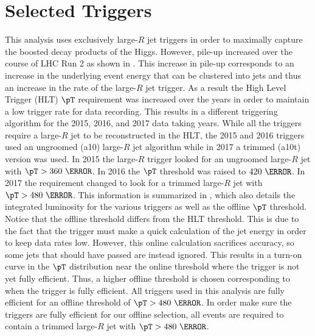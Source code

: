 \section{Selected Triggers} \label{sec:selection:triggers}

This analysis uses exclusively large-$R$ jet triggers in order to maximally
capture the boosted decay products of the Higgs. However, pile-up increased
over the course of LHC Run 2 as shown in . This increase in
pile-up corresponds to an increase in the underlying event energy that can be
clustered into jets and thus an increase in the rate of the large-$R$ jet
trigger. As a result the High Level Trigger (HLT) $\pT$ requirement was
increased over the years in order to maintain a low trigger rate for data
recording.  This results in a different triggering algorithm for the 2015,
2016, and 2017 data taking years.  While all the triggers require a large-$R$
jet to be reconstructed in the HLT, the 2015 and 2016 triggers used an
ungroomed (a10) large-$R$ jet algorithm while in 2017 a trimmed (a10t) version
was used.  In 2015 the large-$R$ trigger looked for an ungroomed large-$R$ jet
with $\pT > 360~\GeV$.  In 2016 the $\pT$ threshold was raised to $420~\GeV$.
In 2017 the requirement changed to look for a trimmed large-$R$ jet with $\pT >
480~\GeV$.  This information is summarized in , which also
details the integrated luminosity for the various triggers as well as the
offline $\pT$ threshold.  Notice that the offline threshold differs from the
HLT threshold.  This is due to the fact that the trigger must make a quick
calculation of the jet energy in order to keep data rates low. However, this
online calculation sacrifices accuracy, so some jets that should have
passed are instead ignored.  This results in a turn-on curve in the $\pT$
distribution near the online threshold where the trigger is not yet fully
efficient. Thus, a higher offline threshold is chosen corresponding to when the
trigger is fully efficient.  All triggers used in this analysis are fully
efficient for an offline threshold of $\pT > 480~\GeV$.  In order make sure the
triggers are fully efficient for our offline selection, all events are required
to contain a trimmed large-$R$ jet with $\pT > 480~\GeV$.

